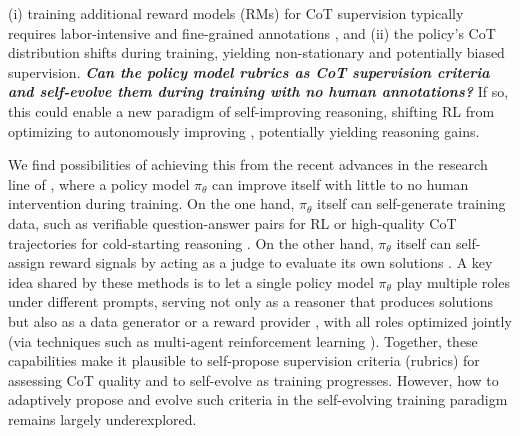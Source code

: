 (i) training additional reward models (RMs) for CoT supervision typically requires labor-intensive and fine-grained annotations \cite{PRM8K, PRIME}, 
and (ii) the policy’s CoT distribution shifts during training, yielding non-stationary and potentially biased supervision. 
\textit{\textbf{Can the policy model  rubrics as CoT supervision criteria and self-evolve them during training with no human annotations?}} 
If so, this could enable a new paradigm of self-improving reasoning, shifting RL from optimizing  to autonomously improving , potentially yielding   reasoning gains.

We find possibilities of achieving this from the recent advances in the research line of  \cite{self-evolving-survey, AlphaZero}, where a policy model $\pi_\theta$ can improve itself with little to no human intervention during training.
On the one hand, $\pi_\theta$ itself can self-generate training data, such as verifiable question-answer pairs for RL or high-quality CoT trajectories for cold-starting reasoning \cite{AbsoluteZero, SPICE, SSP, STaR}.
On the other hand, $\pi_\theta$ itself can self-assign reward signals by acting as a judge to evaluate its own solutions \cite{Self-Rewaring-Rubric, SRLM, SeRL, SPIN}.
A key idea shared by these methods is to let a single policy model $\pi_\theta$ play multiple roles under different prompts, serving not only as a reasoner that produces solutions but also as a data generator or a reward provider \cite{AbsoluteZero, SRLM}, with all roles optimized jointly (\eg via techniques such as multi-agent reinforcement learning \cite{AbsoluteZero}). 
Together, these capabilities make it plausible to self-propose supervision criteria (\eg rubrics) for assessing CoT quality and to self-evolve as training progresses.
However, how to adaptively propose and evolve such criteria in the self-evolving training paradigm remains largely underexplored.

